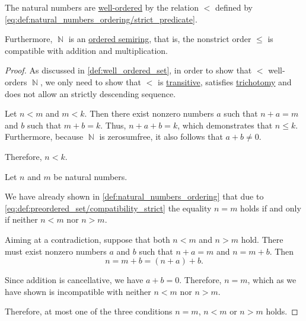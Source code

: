 \begin{proposition}\label{thm:natural_numbers_are_well_ordered}
  The natural numbers are \hyperref[def:well_ordered_set]{well-ordered} by the relation \( < \) defined by \eqref{eq:def:natural_numbers_ordering/strict_predicate}.

  Furthermore, \( \BbbN \) is an \hyperref[def:ordered_semiring]{ordered semiring}, that is, the nonstrict order \( \leq \) is compatible with addition and multiplication.
\end{proposition}
\begin{proof}
  As discussed in \cref{def:well_ordered_set}, in order to show that \( < \) well-orders \( \BbbN \), we only need to show that \( < \) is \hyperref[def:binary_relation/transitive]{transitive}, satisfies \hyperref[def:binary_relation/trichotomy]{trichotomy} and does not allow an strictly descending sequence.

   Let \( n < m \) and \( m < k \). Then there exist nonzero numbers \( a \) such that \( n + a = m \) and \( b \) such that \( m + b = k \). Thus, \( n + a + b = k \), which demonstrates that \( n \leq k \). Furthermore, because \( \BbbN \) is zerosumfree, it also follows that \( a + b \neq 0 \).

  Therefore, \( n < k \).

   Let \( n \) and \( m \) be natural numbers.

  We have already shown in \cref{def:natural_numbers_ordering} that due to \eqref{eq:def:preordered_set/compatibility_strict} the equality \( n = m \) holds if and only if neither \( n < m \) nor \( n > m \).

  Aiming at a contradiction, suppose that both \( n < m \) and \( n > m \) hold. There must exist nonzero numbers \( a \) and \( b \) such that \( n + a = m \) and \( n = m + b \). Then
  \begin{equation*}
    n = m + b = (n + a) + b.
  \end{equation*}

  Since addition is cancellative, we have \( a + b = 0 \). Therefore, \( n = m \), which as we have shown is incompatible with neither \( n < m \) nor \( n > m \).

  Therefore, at most one of the three conditions \( n = m \), \( n < m \) or \( n > m \) holds.


\end{proof}
